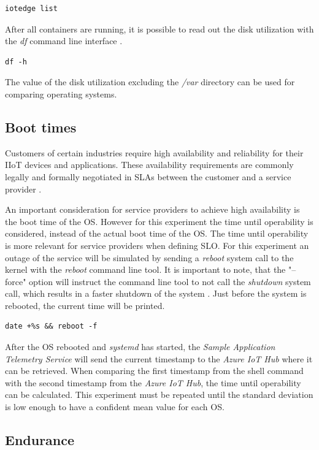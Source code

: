 \begin{lstlisting}[caption=Command to retrieve the status of all containers]
iotedge list
\end{lstlisting}
After all containers are running, it is possible to read out the disk utilization
with the \textit{df} command line interface \cite{man-df}.\\

\begin{lstlisting}[caption=Command to report file system space usage]
df -h
\end{lstlisting}
The value of the disk utilization excluding the \textit{/var} directory
can be used for comparing operating systems.

\subsection{Boot times}
Customers of certain industries require high availability and reliability for
their \ac{IIoT} devices and applications. These availability requirements
are commonly legally and formally negotiated in \ac{SLA}s between
the customer and a service provider \cite{msdoc-slas}.

An important consideration for service providers to achieve high
availability is the boot time of the \ac{OS}. However for this experiment the
time until operability is considered, instead of the actual boot time of the
\ac{OS}. The time until operability is more relevant for service providers
when defining \ac{SLO}.
For this experiment an outage of the service will be simulated by sending a
\textit{reboot} system call to the kernel with the \textit{reboot}
command line tool. It is important to note, that the "--force" option will
instruct the command line tool to not call the \textit{shutdown} system call,
which results in a faster shutdown of the system \cite{man-reboot}\cite{man-shutdown}.
Just before the system is rebooted, the current time will be printed.
\\

\begin{lstlisting}[caption=Command to print the current time and reboot]
date +%s && reboot -f
\end{lstlisting}
After the \ac{OS} rebooted and \textit{systemd} has started, the
\textit{Sample Application Telemetry Service} will send the current timestamp
to the \textit{Azure IoT Hub} where it can be retrieved. When comparing
the first timestamp from the shell command with the second timestamp from
the \textit{Azure IoT Hub}, the time until operability can be calculated.
This experiment must be repeated until the standard deviation is low enough
to have a confident mean value for each \ac{OS}.



\subsection{Endurance}
